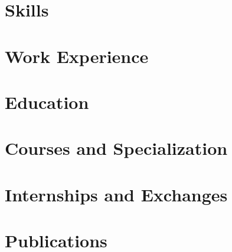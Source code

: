 \documentclass[letter,10pt]{article}
\begin{document}


\section{Skills}


\section{Work Experience}


\section{Education}



\section{Courses and Specialization}


\section{Internships and Exchanges}


\section{Publications}

\end{document}
